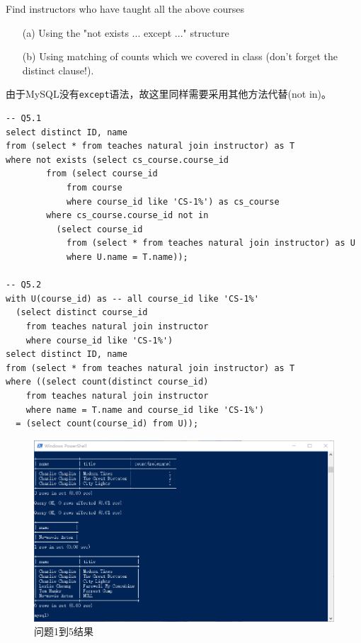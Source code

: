 \documentclass[logo,reportComp]{thesis}
\begin{document}
\begin{question}
\normalfont 
Find instructors who have taught all the above courses
\begin{itemize}
\item [(a)] Using the "not exists ... except ..." structure
\item [(b)] Using matching of counts which we covered in class (don't forget the distinct clause!).
\end{itemize}
\end{question}
\begin{answer}由于MySQL没有\verb'except'语法，故这里同样需要采用其他方法代替(not in)。
\begin{lstlisting}
-- Q5.1
select distinct ID, name
from (select * from teaches natural join instructor) as T
where not exists (select cs_course.course_id
        from (select course_id
            from course
            where course_id like 'CS-1%') as cs_course
        where cs_course.course_id not in
          (select course_id
            from (select * from teaches natural join instructor) as U
            where U.name = T.name));

-- Q5.2
with U(course_id) as -- all course_id like 'CS-1%'
  (select distinct course_id
    from teaches natural join instructor
    where course_id like 'CS-1%')
select distinct ID, name
from (select * from teaches natural join instructor) as T
where ((select count(distinct course_id)
    from teaches natural join instructor
    where name = T.name and course_id like 'CS-1%')
  = (select count(course_id) from U));
\end{lstlisting}
\end{answer}

\begin{figure}[H]
\centering
\includegraphics[width=\linewidth]{fig/Q9-13.png}
\caption{问题1到5结果}
\end{figure}
\end{document}
